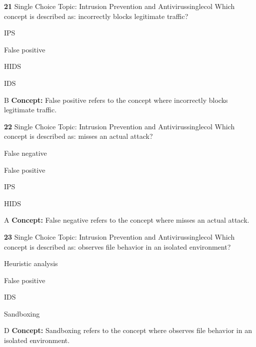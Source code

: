 \documentclass[10pt,a4paper]{article}
\begin{document}
\begin{qcard}{\color{white}\textbf{21} \hfill \small Single Choice \textbar{} Topic: Intrusion Prevention and Antivirus}{singlecol}
Which concept is described as: incorrectly blocks legitimate traffic?

\begin{qoptions}
\item IPS
\item False positive
\item HIDS
\item IDS
\end{qoptions}
\begin{explainbox}{B}
\textbf{Concept:} False positive refers to the concept where incorrectly blocks legitimate traffic.
\end{explainbox}
\end{qcard}

\begin{qcard}{\color{white}\textbf{22} \hfill \small Single Choice \textbar{} Topic: Intrusion Prevention and Antivirus}{singlecol}
Which concept is described as: misses an actual attack?

\begin{qoptions}
\item False negative
\item False positive
\item IPS
\item HIDS
\end{qoptions}
\begin{explainbox}{A}
\textbf{Concept:} False negative refers to the concept where misses an actual attack.
\end{explainbox}
\end{qcard}

\begin{qcard}{\color{white}\textbf{23} \hfill \small Single Choice \textbar{} Topic: Intrusion Prevention and Antivirus}{singlecol}
Which concept is described as: observes file behavior in an isolated environment?

\begin{qoptions}
\item Heuristic analysis
\item False positive
\item IDS
\item Sandboxing
\end{qoptions}
\begin{explainbox}{D}
\textbf{Concept:} Sandboxing refers to the concept where observes file behavior in an isolated environment.
\end{explainbox}
\end{qcard}
\end{document}
